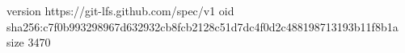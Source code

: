 version https://git-lfs.github.com/spec/v1
oid sha256:c7f0b993298967d632932cb8fcb2128c51d7dc4f0d2c488198713193b11f8b1a
size 3470
